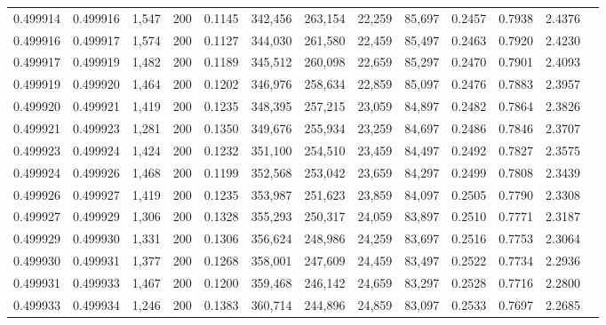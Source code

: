 \begin{tabular}{rrrrrrrrrrrrr}
0.499914 & 0.499916 &  1,547 & 200 &                                     0.1145 & 342,456 & 263,154 &  22,259 &  85,697 & 0.2457 & 0.7938 & 2.4376 \\
0.499916 & 0.499917 &  1,574 & 200 &                                     0.1127 & 344,030 & 261,580 &  22,459 &  85,497 & 0.2463 & 0.7920 & 2.4230 \\
0.499917 & 0.499919 &  1,482 & 200 &                                     0.1189 & 345,512 & 260,098 &  22,659 &  85,297 & 0.2470 & 0.7901 & 2.4093 \\
0.499919 & 0.499920 &  1,464 & 200 &                                     0.1202 & 346,976 & 258,634 &  22,859 &  85,097 & 0.2476 & 0.7883 & 2.3957 \\
0.499920 & 0.499921 &  1,419 & 200 &                                     0.1235 & 348,395 & 257,215 &  23,059 &  84,897 & 0.2482 & 0.7864 & 2.3826 \\
0.499921 & 0.499923 &  1,281 & 200 &                                     0.1350 & 349,676 & 255,934 &  23,259 &  84,697 & 0.2486 & 0.7846 & 2.3707 \\
0.499923 & 0.499924 &  1,424 & 200 &                                     0.1232 & 351,100 & 254,510 &  23,459 &  84,497 & 0.2492 & 0.7827 & 2.3575 \\
0.499924 & 0.499926 &  1,468 & 200 &                                     0.1199 & 352,568 & 253,042 &  23,659 &  84,297 & 0.2499 & 0.7808 & 2.3439 \\
0.499926 & 0.499927 &  1,419 & 200 &                                     0.1235 & 353,987 & 251,623 &  23,859 &  84,097 & 0.2505 & 0.7790 & 2.3308 \\
0.499927 & 0.499929 &  1,306 & 200 &                                     0.1328 & 355,293 & 250,317 &  24,059 &  83,897 & 0.2510 & 0.7771 & 2.3187 \\
0.499929 & 0.499930 &  1,331 & 200 &                                     0.1306 & 356,624 & 248,986 &  24,259 &  83,697 & 0.2516 & 0.7753 & 2.3064 \\
0.499930 & 0.499931 &  1,377 & 200 &                                     0.1268 & 358,001 & 247,609 &  24,459 &  83,497 & 0.2522 & 0.7734 & 2.2936 \\
0.499931 & 0.499933 &  1,467 & 200 &                                     0.1200 & 359,468 & 246,142 &  24,659 &  83,297 & 0.2528 & 0.7716 & 2.2800 \\
0.499933 & 0.499934 &  1,246 & 200 &                                     0.1383 & 360,714 & 244,896 &  24,859 &  83,097 & 0.2533 & 0.7697 & 2.2685 \\

\end{tabular}
